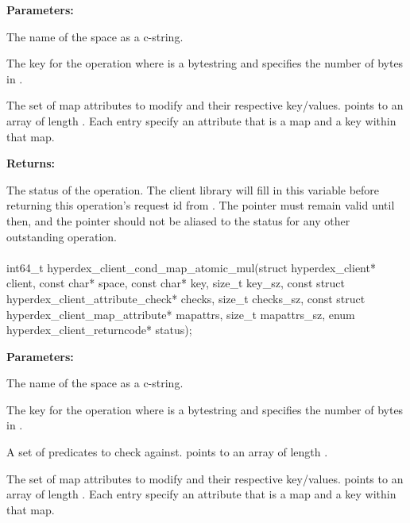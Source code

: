 \noindent\textbf{Parameters:}
\begin{description}[labelindent=\widthof{{\code{mapattrs}, \code{mapattrs\_sz}}},leftmargin=*,noitemsep,nolistsep,align=right]
\item[\code{space}] The name of the space as a c-string.
\item[\code{key}, \code{key\_sz}] The key for the operation where  is a bytestring and  specifies the number of bytes in .
\item[\code{mapattrs}, \code{mapattrs\_sz}] The set of map attributes to modify and their respective key/values.   points to an array of length .  Each entry specify an attribute that is a map and a key within that map.
\end{description}

\noindent\textbf{Returns:}
\begin{description}[labelindent=\widthof{{\code{status}}},leftmargin=*,noitemsep,nolistsep,align=right]
\item[\code{status}] The status of the operation.  The client library will fill in this variable before returning this operation's request id from .  The pointer must remain valid until then, and the pointer should not be aliased to the status for any other outstanding operation.
\end{description}

\paragraph{}
\label{api:c:cond_map_atomic_mul}
\begin{ccode}
int64_t hyperdex_client_cond_map_atomic_mul(struct hyperdex_client* client,
        const char* space,
        const char* key, size_t key_sz,
        const struct hyperdex_client_attribute_check* checks, size_t checks_sz,
        const struct hyperdex_client_map_attribute* mapattrs, size_t mapattrs_sz,
        enum hyperdex_client_returncode* status);
\end{ccode}
\funcdesc 

\noindent\textbf{Parameters:}
\begin{description}[labelindent=\widthof{{\code{mapattrs}, \code{mapattrs\_sz}}},leftmargin=*,noitemsep,nolistsep,align=right]
\item[\code{space}] The name of the space as a c-string.
\item[\code{key}, \code{key\_sz}] The key for the operation where  is a bytestring and  specifies the number of bytes in .
\item[\code{checks}, \code{checks\_sz}] A set of predicates to check against.   points to an array of length .
\item[\code{mapattrs}, \code{mapattrs\_sz}] The set of map attributes to modify and their respective key/values.   points to an array of length .  Each entry specify an attribute that is a map and a key within that map.
\end{description}

